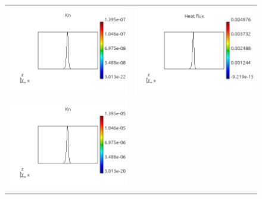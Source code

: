 \documentclass[review]{elsarticle}
\begin{document}
\begin{figure}[tbh]
  \begin{center}
    \begin{tabular}{cc}
      \includegraphics[width=\psize\textwidth]{figs/Kn_p51D1e14.png} &
      \includegraphics[width=\psize\textwidth]{figs/hflux_p51D1e14.png} \\
      \includegraphics[width=\psize\textwidth]{figs/Kn_p51D1e12.png} &

\end{tabular}
\end{center}
\end{figure}
\end{document}
